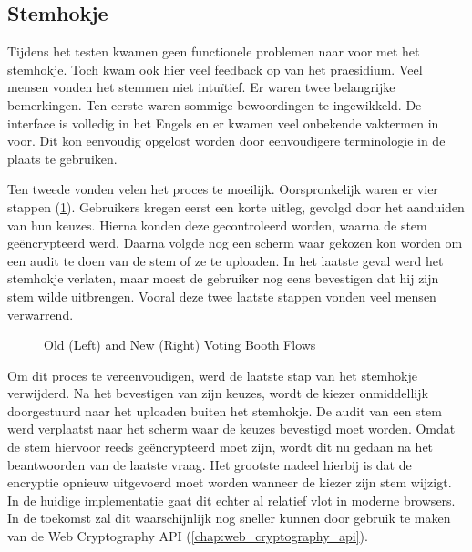 \subsection{Stemhokje}
\label{sec:kv:stemhokje}

Tijdens het testen kwamen geen functionele problemen naar voor met het stemhokje. Toch kwam ook hier veel feedback op van het praesidium. Veel mensen vonden het stemmen niet intu\"itief. Er waren twee belangrijke bemerkingen. Ten eerste waren sommige bewoordingen te ingewikkeld. De interface is volledig in het Engels en er kwamen veel onbekende vaktermen in voor. Dit kon eenvoudig opgelost worden door eenvoudigere terminologie in de plaats te gebruiken.

\npar Ten tweede vonden velen het proces te moeilijk. Oorspronkelijk waren er vier stappen (\ref{fig:kv:voting_booth_flows}). Gebruikers kregen eerst een korte uitleg, gevolgd door het aanduiden van hun keuzes. Hierna konden deze gecontroleerd worden, waarna de stem ge\"encrypteerd werd. Daarna volgde nog een scherm waar gekozen kon worden om een audit te doen van de stem of ze te uploaden. In het laatste geval werd het stemhokje verlaten, maar moest de gebruiker nog eens bevestigen dat hij zijn stem wilde uitbrengen. Vooral deze twee laatste stappen vonden veel mensen verwarrend.

\begin{figure}
  \centering
  \begin{minipage}{.45\linewidth}
    \centering
    \scalebox{.7}{}
  \end{minipage}
  \quad
  \begin{minipage}{.45\linewidth}
    \centering
    \scalebox{.7}{}
  \end{minipage}
  \caption{Old (Left) and New (Right) Voting Booth Flows}
  \label{fig:kv:voting_booth_flows}
\end{figure}

\npar Om dit proces te vereenvoudigen, werd de laatste stap van het stemhokje verwijderd. Na het bevestigen van zijn keuzes, wordt de kiezer onmiddellijk doorgestuurd naar het uploaden buiten het stemhokje. De audit van een stem werd verplaatst naar het scherm waar de keuzes bevestigd moet worden. Omdat de stem hiervoor reeds ge\"encrypteerd moet zijn, wordt dit nu gedaan na het beantwoorden van de laatste vraag. Het grootste nadeel hierbij is dat de encryptie opnieuw uitgevoerd moet worden wanneer de kiezer zijn stem wijzigt. In de huidige implementatie gaat dit echter al relatief vlot in moderne browsers. In de toekomst zal dit waarschijnlijk nog sneller kunnen door gebruik te maken van de Web Cryptography API (\ref{chap:web_cryptography_api}).

